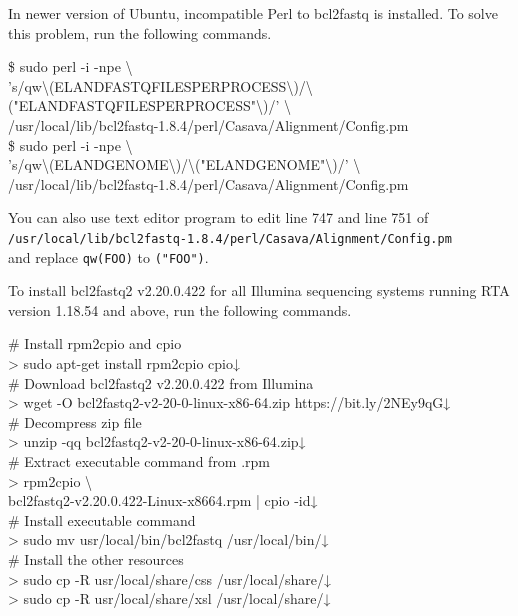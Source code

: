 \documentclass[titlepage,10pt,a4paper,english]{jsbook}
\newenvironment{cmd}{\begin{oframed}\raggedright\ttfamily\footnotesize\setlength{\baselineskip}{1.4em}}{\end{oframed}\vspace{-1em}}
\begin{document}
In newer version of Ubuntu, incompatible Perl to bcl2fastq is installed.
To solve this problem, run the following commands.

\begin{cmd}
\$ sudo perl -i -npe {\textbackslash}\\
's/qw{\textbackslash}(ELAND{\textunderscore}FASTQ{\textunderscore}FILES{\textunderscore}PER{\textunderscore}PROCESS{\textbackslash})/{\textbackslash}("ELAND{\textunderscore}FASTQ{\textunderscore}FILES{\textunderscore}PER{\textunderscore}PROCESS"{\textbackslash})/' {\textbackslash}\\
/usr/local/lib/bcl2fastq-1.8.4/perl/Casava/Alignment/Config.pm\\
\$ sudo perl -i -npe {\textbackslash}\\
's/qw{\textbackslash}(ELAND{\textunderscore}GENOME{\textbackslash})/{\textbackslash}("ELAND{\textunderscore}GENOME"{\textbackslash})/' {\textbackslash}\\
/usr/local/lib/bcl2fastq-1.8.4/perl/Casava/Alignment/Config.pm
\end{cmd}

You can also use text editor program to edit line 747 and line 751 of\\
\texttt{/usr/local/lib/bcl2fastq-1.8.4/perl/Casava/Alignment/Config.pm}\\
and replace \texttt{qw(FOO)} to \texttt{("FOO")}.

To install bcl2fastq2 v2.20.0.422 for all Illumina sequencing systems running RTA version 1.18.54 and above, run the following commands.

\begin{cmd}
\# Install rpm2cpio and cpio\\
{\textgreater} sudo apt-get install rpm2cpio cpio↓\\
\# Download bcl2fastq2 v2.20.0.422 from Illumina\\
{\textgreater} wget -O bcl2fastq2-v2-20-0-linux-x86-64.zip https://bit.ly/2NEy9qG↓\\
\# Decompress zip file\\
{\textgreater} unzip -qq bcl2fastq2-v2-20-0-linux-x86-64.zip↓\\
\# Extract executable command from .rpm\\
{\textgreater} rpm2cpio {\textbackslash}\\
bcl2fastq2-v2.20.0.422-Linux-x86{\textunderscore}64.rpm | cpio -id↓\\
\# Install executable command\\
{\textgreater} sudo mv usr/local/bin/bcl2fastq /usr/local/bin/↓\\
\# Install the other resources\\
{\textgreater} sudo cp -R usr/local/share/css /usr/local/share/↓\\
{\textgreater} sudo cp -R usr/local/share/xsl /usr/local/share/↓
\end{cmd}
\end{document}
